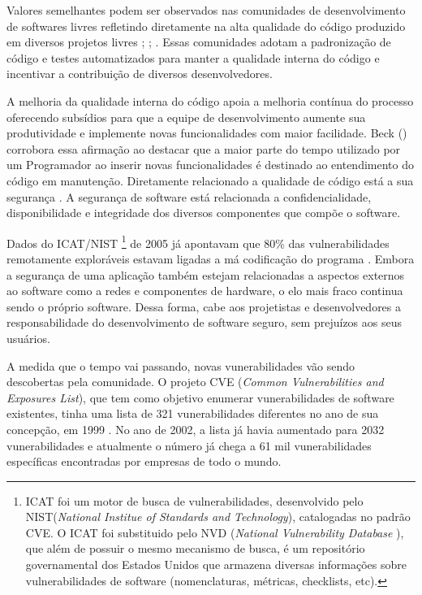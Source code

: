 Valores semelhantes podem ser observados nas comunidades de desenvolvimento de softwares livres refletindo diretamente na alta qualidade do código produzido em diversos projetos livres \cite{schmidt2001}; \cite{halloran2002}; \cite{michlmayr2003}.
%
Essas comunidades adotam a padronização de código e testes automatizados para manter a qualidade interna do código e incentivar a contribuição de diversos desenvolvedores.

A melhoria da qualidade interna do código apoia a melhoria contínua do processo oferecendo subsídios para que a equipe de desenvolvimento aumente sua produtividade e implemente novas funcionalidades com maior facilidade. Beck (\citeyear{beck2007}) corrobora essa afirmação ao destacar que a maior parte do tempo utilizado por um Programador ao inserir novas funcionalidades é destinado ao entendimento do código em manutenção. 
%
Diretamente relacionado a qualidade de código está a sua segurança \cite{tsipenyuk2005}. A segurança de software está relacionada a confidencialidade, disponibilidade e integridade dos diversos componentes que compõe o software.

Dados do ICAT/NIST
\footnote{ ICAT foi um motor de busca de vulnerabilidades, desenvolvido pelo NIST(\emph{National Institue of Standards and Technology}), catalogadas no padrão CVE. O ICAT foi substituido pelo NVD (\emph{National Vulnerability Database }), que além de possuir o mesmo mecanismo de busca, é um repositório governamental dos Estados Unidos que armazena diversas informações sobre vulnerabilidades de software (nomenclaturas, métricas, checklists, etc).} de 2005 já apontavam que 80\% das vulnerabilidades remotamente exploráveis estavam ligadas a má codificação do programa \cite{duarte2005}.
%
Embora a segurança de uma aplicação também estejam relacionadas a aspectos externos ao software como a redes e componentes de hardware, o elo mais fraco continua sendo o próprio software. Dessa forma, cabe aos projetistas e desenvolvedores a responsabilidade do desenvolvimento de software seguro, sem prejuízos aos seus usuários.

%

A medida que o tempo vai passando, novas vunerabilidades vão sendo descobertas pela comunidade. O projeto CVE (\emph{Common Vulnerabilities and Exposures List}), que tem como objetivo enumerar vunerabilidades de software existentes, tinha uma lista de 321 vunerabilidades diferentes no ano de sua concepção, em 1999 \cite{cve2002}.
%
No ano de 2002, a lista já havia aumentado para 2032 vunerabilidades e atualmente o número já chega a 61 mil vunerabilidades específicas encontradas por empresas de todo o mundo.


